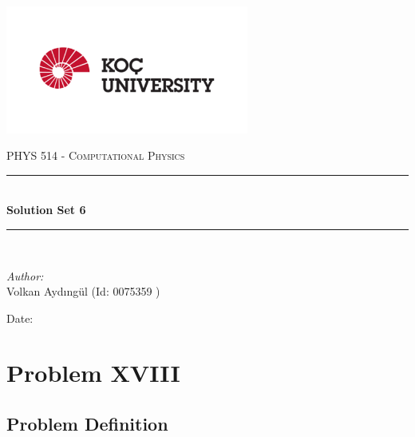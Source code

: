 \documentclass[letterpaper,12pt]{article}
\newcommand{\reporttitle}{Solution Set 6}
\newcommand{\reportauthor}{ Volkan Aydıngül (Id: 0075359 )\\
                            }
\begin{document}
\begin{titlepage}
\newcommand{\HRule}{\rule{0.7\linewidth}{0.5mm}}
\begin{center} %
\includegraphics[width = 8cm]{figures/koc_logo.png}

\textsc{\Large PHYS 514 - Computational Physics}\\[1.5cm] 
\HRule \\[0.6cm]
{ \huge \bfseries \reporttitle}\\ %
\HRule \\[1.5cm]
\end{center}
\vspace{2cm}
\begin{flushleft} \large
\textit{Author:}\\
\reportauthor%
\end{flushleft}
\vspace{2cm}
\makeatletter
Date: \@date 
\vfill %
\makeatother
\end{titlepage}




\tableofcontents
\newpage






\section{Problem XVIII}
\subsection{Problem Definition}
\end{document}
